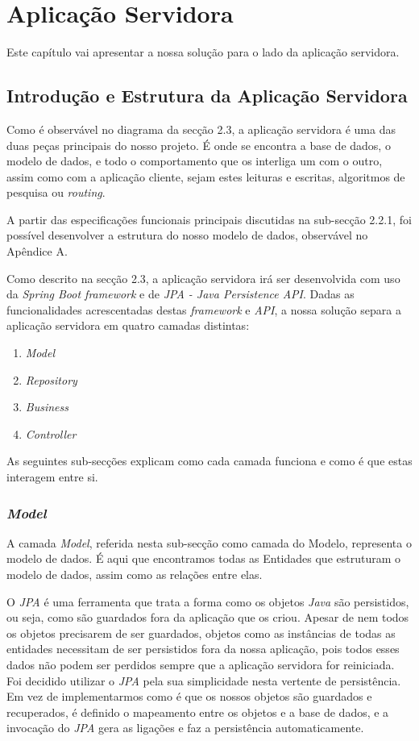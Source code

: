 %
\chapter{Aplicação Servidora} \label{cap:exemplos}

Este capítulo vai apresentar a nossa solução para o lado da aplicação servidora.

\section{Introdução e Estrutura da Aplicação Servidora} \label{sec31}
Como é observável no diagrama da secção 2.3, a aplicação servidora é uma das duas peças principais do nosso projeto. É onde se encontra a base de dados, o modelo de dados, e todo o comportamento que os interliga um com o outro, assim como com a aplicação cliente, sejam estes leituras e escritas, algoritmos de pesquisa ou \emph{routing}.

A partir das especificações funcionais principais discutidas na sub-secção 2.2.1, foi possível desenvolver a estrutura do nosso modelo de dados, observável no Apêndice A.

Como descrito na secção 2.3, a aplicação servidora irá ser desenvolvida com uso da \emph{Spring Boot framework} e de 
\emph{JPA - Java Persistence API}. Dadas as funcionalidades acrescentadas destas \emph{framework} e \emph{API}, a nossa solução separa a aplicação servidora em quatro camadas distintas:
\begin{enumerate}
	\item \emph{Model}
	\item \emph{Repository}
	\item \emph{Business}
	\item \emph{Controller}
\end{enumerate}
As seguintes sub-secções explicam como cada camada funciona e como é que estas interagem entre si.

\subsection{\emph{Model}} \label{sec311}
A camada \emph{Model}, referida nesta sub-secção como camada do Modelo, representa o modelo de dados. É aqui que encontramos todas as Entidades que estruturam o modelo de dados, assim como as relações entre elas. 

O \textit{JPA} é uma ferramenta que trata a forma como os objetos \textit{Java} são persistidos, ou seja, como são guardados fora da aplicação que os criou. Apesar de nem todos os objetos precisarem de ser guardados, objetos como as instâncias de todas as entidades necessitam de ser persistidos fora da nossa aplicação, pois todos esses dados não podem ser perdidos sempre que a aplicação servidora for reiniciada. 
Foi decidido utilizar o \textit{JPA} pela sua simplicidade nesta vertente de persistência. Em vez de implementarmos como é que os nossos objetos são guardados e recuperados, é definido o mapeamento entre os objetos e a base de dados, e a invocação do \textit{JPA} gera as ligações e faz a persistência automaticamente.

